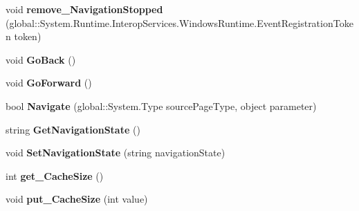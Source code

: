 \begin{DoxyCompactItemize}
\item 
\mbox{\label{interface_windows_1_1_u_i_1_1_xaml_1_1_controls_1_1_i_frame_adb7fdd2a3d4caa3565de5270aeb78262}} 
void {\bfseries remove\+\_\+\+Navigation\+Stopped} (global\+::\+System.\+Runtime.\+Interop\+Services.\+Windows\+Runtime.\+Event\+Registration\+Token token)
\item 
\mbox{\label{interface_windows_1_1_u_i_1_1_xaml_1_1_controls_1_1_i_frame_a030d64c39f359cacb399064bd14c6360}} 
void {\bfseries Go\+Back} ()
\item 
\mbox{\label{interface_windows_1_1_u_i_1_1_xaml_1_1_controls_1_1_i_frame_aa80a1d8a508afe0e94ed4d473c8bab8f}} 
void {\bfseries Go\+Forward} ()
\item 
\mbox{\label{interface_windows_1_1_u_i_1_1_xaml_1_1_controls_1_1_i_frame_a26a5d60621812443d6a0837e7c36c53e}} 
bool {\bfseries Navigate} (global\+::\+System.\+Type source\+Page\+Type, object parameter)
\item 
\mbox{\label{interface_windows_1_1_u_i_1_1_xaml_1_1_controls_1_1_i_frame_a5fae043ba619aec40326928f7c8f0708}} 
string {\bfseries Get\+Navigation\+State} ()
\item 
\mbox{\label{interface_windows_1_1_u_i_1_1_xaml_1_1_controls_1_1_i_frame_abca9cc6c6c9ab20f0837c2d3734275f1}} 
void {\bfseries Set\+Navigation\+State} (string navigation\+State)
\item 
\mbox{\label{interface_windows_1_1_u_i_1_1_xaml_1_1_controls_1_1_i_frame_a928bc8fe265cccd51999efbf6dc79625}} 
int {\bfseries get\+\_\+\+Cache\+Size} ()
\item 
\mbox{\label{interface_windows_1_1_u_i_1_1_xaml_1_1_controls_1_1_i_frame_a090d2a89af30c25a8ade9df9f28d63a2}} 
void {\bfseries put\+\_\+\+Cache\+Size} (int value)

\end{DoxyCompactItemize}
